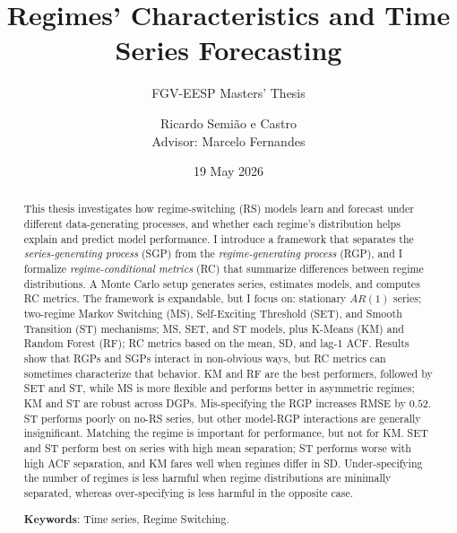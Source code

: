 \documentclass[
  letterpaper,
  DIV=11,
  numbers=noendperiod]{scrartcl}
\title{Regimes' Characteristics and Time Series Forecasting}
\subtitle{FGV-EESP Masters' Thesis}
\author{Ricardo Semião e Castro\\
Advisor: Marcelo Fernandes}
\date{19 May 2026}
\numberwithin{equation}{section}
\numberwithin{table}{section}
\numberwithin{figure}{section}
\let\oldsection\section
\renewcommand\section{\clearpage\oldsection}
\begin{document}
\maketitle
\begin{abstract}
This thesis investigates how regime-switching (RS) models learn and
forecast under different data-generating processes, and whether each
regime's distribution helps explain and predict model performance. I
introduce a framework that separates the \emph{series-generating
process} (SGP) from the \emph{regime-generating process} (RGP), and I
formalize \emph{regime-conditional metrics} (RC) that summarize
differences between regime distributions. A Monte Carlo setup generates
series, estimates models, and computes RC metrics. The framework is
expandable, but I focus on: stationary \(AR(1)\) series; two-regime
Markov Switching (MS), Self-Exciting Threshold (SET), and Smooth
Transition (ST) mechanisms; MS, SET, and ST models, plus K-Means (KM)
and Random Forest (RF); RC metrics based on the mean, SD, and lag-1 ACF.
Results show that RGPs and SGPs interact in non-obvious ways, but RC
metrics can sometimes characterize that behavior. KM and RF are the best
performers, followed by SET and ST, while MS is more flexible and
performs better in asymmetric regimes; KM and ST are robust across DGPs.
Mis-specifying the RGP increases RMSE by \(0.52\). ST performs poorly on
no-RS series, but other model-RGP interactions are generally
insignificant. Matching the regime is important for performance, but not
for KM. SET and ST perform best on series with high mean separation; ST
performs worse with high ACF separation, and KM fares well when regimes
differ in SD. Under-specifying the number of regimes is less harmful
when regime distributions are minimally separated, whereas
over-specifying is less harmful in the opposite case.

\textbf{Keywords}: Time series, Regime Switching.
\end{abstract}


\newcommand{\sgp}{\text{sgp}}
\newcommand{\rgp}{\text{rgp}}
\newcommand{\dgp}{\text{dgp}}
\renewcommand{\mod}{\text{mod}}
\newcommand{\met}{\text{met}}
\newcommand{\disp}{\text{disp}}

\renewenvironment{quote}
    {\list{}{\rightmargin\leftmargin}%
    \item\relax\color{red}}
    {\endlist}

\begingroup
\tableofcontents
\endgroup
\end{document}
